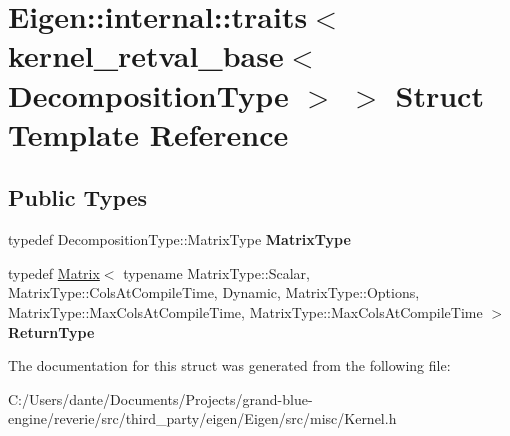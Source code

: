 \hypertarget{struct_eigen_1_1internal_1_1traits_3_01kernel__retval__base_3_01_decomposition_type_01_4_01_4}{}\section{Eigen\+::internal\+::traits$<$ kernel\+\_\+retval\+\_\+base$<$ Decomposition\+Type $>$ $>$ Struct Template Reference}
\label{struct_eigen_1_1internal_1_1traits_3_01kernel__retval__base_3_01_decomposition_type_01_4_01_4}
\subsection*{Public Types}
\begin{DoxyCompactItemize}
\item 
\mbox{\label{struct_eigen_1_1internal_1_1traits_3_01kernel__retval__base_3_01_decomposition_type_01_4_01_4_a42f7adb6bf62e05402f6f461eb075fa2}} 
typedef Decomposition\+Type\+::\+Matrix\+Type {\bfseries Matrix\+Type}
\item 
\mbox{\label{struct_eigen_1_1internal_1_1traits_3_01kernel__retval__base_3_01_decomposition_type_01_4_01_4_a3319541f306277cd67ea29a75c165cb5}} 
typedef \mbox{\hyperlink{class_eigen_1_1_matrix}{Matrix}}$<$ typename Matrix\+Type\+::\+Scalar, Matrix\+Type\+::\+Cols\+At\+Compile\+Time, Dynamic, Matrix\+Type\+::\+Options, Matrix\+Type\+::\+Max\+Cols\+At\+Compile\+Time, Matrix\+Type\+::\+Max\+Cols\+At\+Compile\+Time $>$ {\bfseries Return\+Type}
\end{DoxyCompactItemize}


The documentation for this struct was generated from the following file\+:\begin{DoxyCompactItemize}
\item 
C\+:/\+Users/dante/\+Documents/\+Projects/grand-\/blue-\/engine/reverie/src/third\+\_\+party/eigen/\+Eigen/src/misc/Kernel.\+h\end{DoxyCompactItemize}
